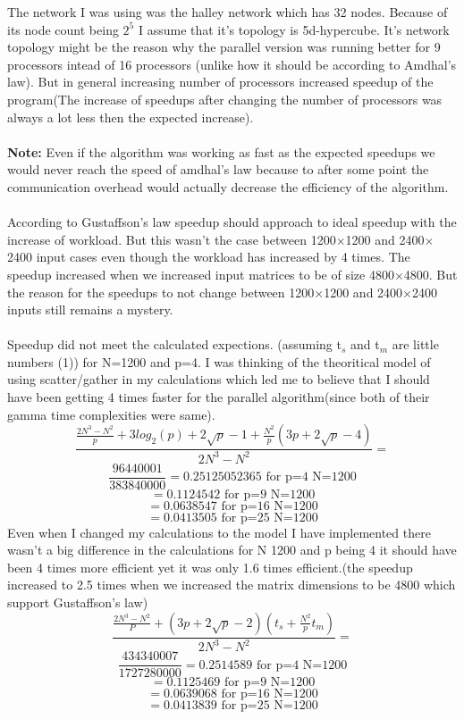 The network I was using was the halley network which has 32 nodes. Because of its node count being $2^5$ I assume that it's topology is 5d-hypercube. It's network topology might be the reason why the parallel version was running better for 9 processors intead of 16 processors (unlike how it should be according to Amdhal's law). But in general increasing number of processors increased speedup of the program(The increase of speedups after changing the number of processors was always a lot less then the expected increase).\\
\\
\textbf{Note:} Even if the algorithm was working as fast as the expected speedups we would never reach the speed of amdhal's law because to after some point the communication overhead would actually decrease the efficiency of the algorithm.\\
\\
According to Gustaffson's law speedup should approach to ideal speedup with the increase of workload. But this wasn't the case between 1200$\times$1200 and 2400$\times$2400 input cases even though the workload has increased by 4 times. The speedup increased when we increased input matrices to be of size 4800$\times$4800. But the reason for the speedups to not change between 1200$\times$1200 and 2400$\times$2400 inputs still remains a mystery.\\
\\
Speedup did not meet the calculated expections. (assuming t$_s$ and t$_m$ are little numbers (1)) for N=1200 and p=4. I was thinking of the theoritical model of using scatter/gather in my calculations which led me to believe that I should have been getting 4 times faster for the parallel algorithm(since both of their gamma time complexities were same).
\[
\frac{\frac{2N^3-N^2}{p}+3log_2(p)+2\sqrt{p}-1+\frac{N^2}{p}(3p+2\sqrt{p}-4)}{2N^3-N^2}=
\]
\[\frac{96440001}{383840000}=0.25125052365 \text{ for p=4 N=1200}
\]
\[=0.1124542 \text{ for p=9 N=1200}\]
\[=0.0638547 \text{ for p=16 N=1200}\]
\[=0.0413505 \text{ for p=25 N=1200}\]
Even when I changed my calculations to the model I have implemented there wasn't a big difference in the calculations for N 1200 and p being 4 it should have been 4 times more efficient yet it was only 1.6 times efficient.(the speedup increased to 2.5 times when we increased the matrix dimensions to be 4800 which support Gustaffson's law) 
\[
\frac{\frac{2N^3-N^2}{P}+(3p+2\sqrt{p}-2)(t_s+\frac{N^2}{p}t_m)}{2N^3-N^2}=
\]
\[\frac{434340007}{1727280000}=0.2514589 \text{ for p=4 N=1200}
\]
\[=0.1125469\text{ for p=9 N=1200}\]
\[=0.0639068\text{ for p=16 N=1200}\]
\[=0.0413839\text{ for p=25 N=1200}\]